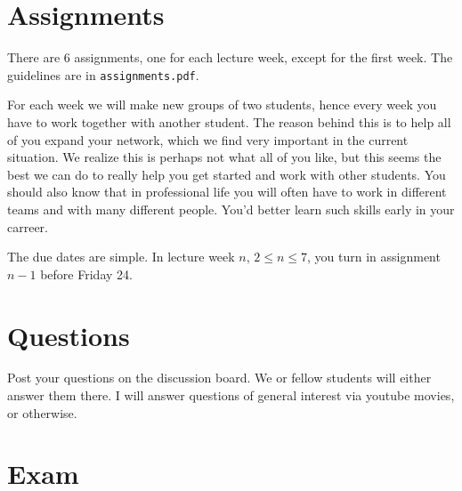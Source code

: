\documentclass[a4paper]{article}
\theoremstyle{definition}
\newcommand{\1}[1]{\,I_{#1}} %
\begin{document}
\section{Assignments}
\label{sec:orgaa72b58}
There are 6 assignments, one for each lecture week, except for the first week. The guidelines are in \texttt{assignments.pdf}.

For each week we will make new groups of two students, hence every week you have to work together with another student.
The reason behind this is to help all of you expand your network, which we find very important in the current situation.
We realize this is perhaps not what all of you like, but this seems the best we can do to really help you get started and work with other students.
You should also know that in professional life you will often have to work in different teams and with many different people.
You'd better learn such skills early in your carreer.

The due dates are  simple. In lecture week \(n\), \(2\leq n\leq 7\), you turn in assignment \(n-1\) before Friday 24. 



\section{Questions}
\label{sec:org5647a1d}

Post your questions on the discussion board.
We or fellow students will either answer them there.
I will answer questions of general interest via youtube movies, or otherwise.

\section{Exam}
\label{sec:orgd2d25d1}
\end{document}

